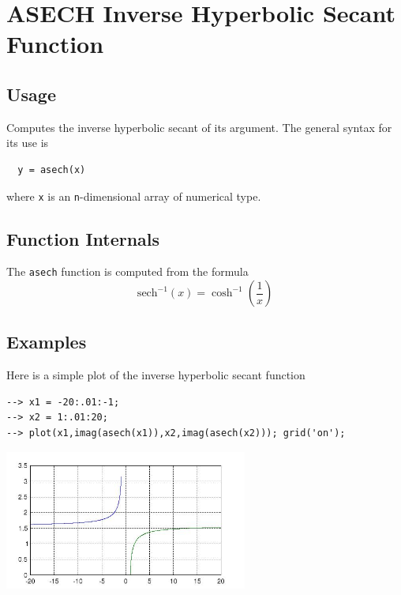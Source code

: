 \section{ASECH Inverse Hyperbolic Secant Function}

\subsection{Usage}

Computes the inverse hyperbolic secant of its argument.  The general
syntax for its use is
\begin{verbatim}
  y = asech(x)
\end{verbatim}
where \verb|x| is an \verb|n|-dimensional array of numerical type.
\subsection{Function Internals}

The \verb|asech| function is computed from the formula
\[
   \mathrm{sech}^{-1}(x) = \cosh^{-1}\left(\frac{1}{x}\right)
\]
\subsection{Examples}

Here is a simple plot of the inverse hyperbolic secant function
\begin{verbatim}
--> x1 = -20:.01:-1;
--> x2 = 1:.01:20;
--> plot(x1,imag(asech(x1)),x2,imag(asech(x2))); grid('on');
\end{verbatim}


\centerline{\includegraphics[width=8cm]{asechplot}}

